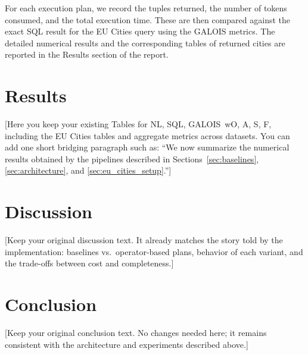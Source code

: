 \documentclass[11pt]{article}
\begin{document}
For each execution plan, we record the tuples returned, the number of tokens consumed,
and the total execution time. These are then compared against the exact SQL result for
the EU Cities query using the GALOIS metrics. The detailed numerical results and the
corresponding tables of returned cities are reported in the Results section of the report.

\section{Results}

[Here you keep your existing Tables for NL, SQL, GALOIS~wO, A, S, F, including the
EU Cities tables and aggregate metrics across datasets. You can add one short bridging
paragraph such as: “We now summarize the numerical results obtained by the pipelines
described in Sections~\ref{sec:baselines}, \ref{sec:architecture}, and
\ref{sec:eu_cities_setup}.”]

\section{Discussion}

[Keep your original discussion text. It already matches the story told by the
implementation: baselines vs.\ operator-based plans, behavior of each variant, and the
trade-offs between cost and completeness.]

\section{Conclusion}

[Keep your original conclusion text. No changes needed here; it remains consistent with
the architecture and experiments described above.]
\end{document}
